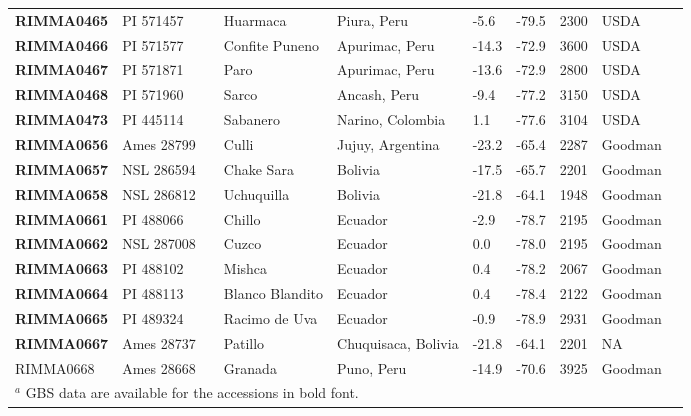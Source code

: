 \documentclass[onecolumn,oneside,letterpaper]{article}
\begin{document}
\begin{table}[h]
\begin{center}
{\begin{tabular}{llllllllll}
{\bf RIMMA0465}	&	PI 571457	&		&	Huarmaca	&	Piura, Peru	&	-5.6 	&	-79.5 	&	2300	&	USDA	\\
{\bf RIMMA0466}	&	PI 571577	&		&	Confite Puneno	&	Apurimac, Peru	&	-14.3 	&	-72.9 	&	3600	&	USDA	\\
{\bf RIMMA0467}	&	PI 571871	&		&	Paro	&	Apurimac, Peru	&	-13.6 	&	-72.9 	&	2800	&	USDA	\\
{\bf RIMMA0468}	&	PI 571960	&		&	Sarco	&	Ancash, Peru	&	-9.4 	&	-77.2 	&	3150	&	USDA	\\
{\bf RIMMA0473}	&	PI 445114	&		&	Sabanero	&	Narino, Colombia	&	1.1 	&	-77.6 	&	3104	&	USDA	\\
{\bf RIMMA0656}	&	Ames 28799	&		&	Culli	&	Jujuy, Argentina	&	-23.2 	&	-65.4 	&	2287	&	Goodman	\\
{\bf RIMMA0657}	&	NSL 286594	&		&	Chake Sara	&	Bolivia	&	-17.5 	&	-65.7 	&	2201	&	Goodman	\\
{\bf RIMMA0658}	&	NSL 286812	&		&	Uchuquilla	&	Bolivia	&	-21.8 	&	-64.1 	&	1948	&	Goodman	\\
{\bf RIMMA0661}	&	PI 488066	&		&	Chillo	&	Ecuador	&	-2.9 	&	-78.7 	&	2195	&	Goodman	\\
{\bf RIMMA0662}	&	NSL 287008	&		&	Cuzco	&	Ecuador	&	0.0 	&	-78.0 	&	2195	&	Goodman	\\
{\bf RIMMA0663}	&	PI 488102	&		&	Mishca	&	Ecuador	&	0.4 	&	-78.2 	&	2067	&	Goodman	\\
{\bf RIMMA0664}	&	PI 488113	&		&	Blanco Blandito	&	Ecuador	&	0.4 	&	-78.4 	&	2122	&	Goodman	\\
{\bf RIMMA0665}	&	PI 489324	&		&	Racimo de Uva	&	Ecuador	&	-0.9 	&	-78.9 	&	2931	&	Goodman	\\
{\bf RIMMA0667}	&	Ames 28737	&		&	Patillo	&	Chuquisaca, Bolivia	&	-21.8 	&	-64.1 	&	2201	&	NA	\\
RIMMA0668	&	Ames 28668	&		&	Granada	&	Puno, Peru	&	-14.9 	&	-70.6 	&	3925	&	Goodman	\\[-0.1mm] 
	\hline\hline
	\multicolumn{9}{l}{$^a$ GBS data are available for the accessions in bold font.}\\
    \end{tabular}}
    \label{srkid}

\end{center} 

\end{table}
\end{document}
